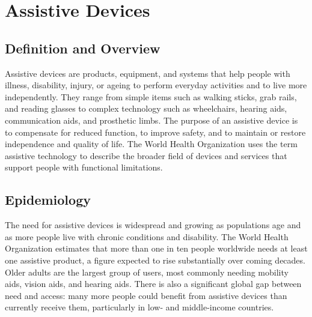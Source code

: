 \chapter{Assistive Devices}

\section*{Definition and Overview}
Assistive devices are products, equipment, and systems that help people with illness, disability, injury, or ageing to perform everyday activities and to live more independently. They range from simple items such as walking sticks, grab rails, and reading glasses to complex technology such as wheelchairs, hearing aids, communication aids, and prosthetic limbs. The purpose of an assistive device is to compensate for reduced function, to improve safety, and to maintain or restore independence and quality of life. The World Health Organization uses the term assistive technology to describe the broader field of devices and services that support people with functional limitations.

\section*{Epidemiology}
The need for assistive devices is widespread and growing as populations age and as more people live with chronic conditions and disability. The World Health Organization estimates that more than one in ten people worldwide needs at least one assistive product, a figure expected to rise substantially over coming decades. Older adults are the largest group of users, most commonly needing mobility aids, vision aids, and hearing aids. There is also a significant global gap between need and access: many more people could benefit from assistive devices than currently receive them, particularly in low- and middle-income countries.

